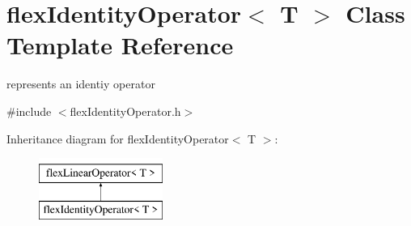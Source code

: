 \hypertarget{classflex_identity_operator}{}\section{flex\+Identity\+Operator$<$ T $>$ Class Template Reference}
\label{classflex_identity_operator}


represents an identiy operator  




{\ttfamily \#include $<$flex\+Identity\+Operator.\+h$>$}

Inheritance diagram for flex\+Identity\+Operator$<$ T $>$\+:\begin{figure}[H]
\begin{center}
\leavevmode
\includegraphics[height=2.000000cm]{classflex_identity_operator}
\end{center}
\end{figure}

